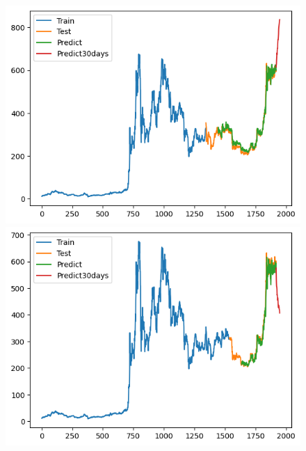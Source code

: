 \documentclass[conference]{IEEEtran}
\begin{document}
	        \begin{figure}[H]
			\centering
			\begin{minipage}{0.15\textwidth}
				\centering
				\includegraphics[width=1\textwidth]{Figure/TimesNet_BNB_73.png}
			\end{minipage}
			\hfill
			\begin{minipage}{0.15\textwidth}
				\centering
				\includegraphics[width=1\textwidth]{Figure/TimesNet_BNB_82.png}
			\end{minipage}
			\hfill
			\begin{minipage}{0.15\textwidth}
				\centering

\end{minipage}
\end{figure}
\end{document}
